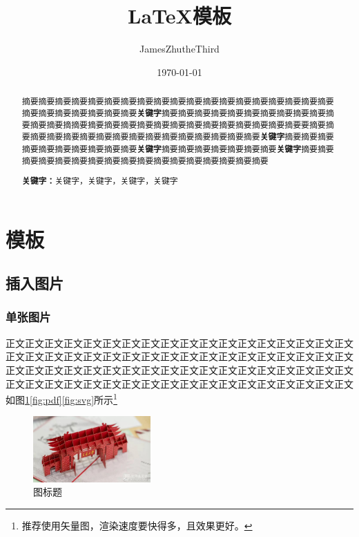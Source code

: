 \documentclass[a4paper]{article}
\title{\LaTeX 模板}
\author{JamesZhutheThird}
\date{\today}
\begin{document}
\maketitle
\pagestyle{fancyStyle}
\thispagestyle{fancyStyleForTitle}

\begin{abstract}
摘要摘要摘要摘要摘要摘要摘要摘要摘要摘要摘要摘要摘要摘要摘要摘要摘要摘要摘要摘要摘要摘要摘要摘要摘要摘要\textbf{关键字}摘要摘要摘要摘要摘要摘要摘要摘要摘要摘要摘要摘要摘要摘摘要摘要摘要摘要摘要摘要摘要摘要摘要摘要摘要摘要摘要摘要要摘要摘要摘要摘要摘要摘要摘要摘要摘要摘要摘要摘要摘要摘要摘要摘要\textbf{关键字}摘要摘要摘要摘要摘要摘要摘要摘要摘要摘要\textbf{关键字}摘要摘要摘要摘要摘要摘要摘要\textbf{关键字}摘要摘要摘要摘要摘要摘要摘要摘要摘要摘要摘要摘要摘要摘要摘要摘要摘要
\par\textbf{关键字：}关键字，关键字，关键字，关键字
\end{abstract}


\section{模板}
\subsection{插入图片}
\subsubsection{单张图片}
正文正文正文正文正文正文正文正文\cite{doi:10.5772/4740}正文正文正文正文正文正文正文正文正文正文正文正文正文正文正文正文正文正文正文正文正文正文正文正文正文正文正文正文正文正文正文正文正文正文正文正文正文正文正文正文正文正文正文正文正文正文正文正文正文正文正文正文正文正文正文正文正文正文正文正文正文正文正文正文如图\ref{fig:single}\ref{fig:pdf}\ref{fig:svg}所示\footnote{推荐使用矢量图，渲染速度要快得多，且效果更好。}

\begin{figure}[!h]
	\centering
	\vspace{0cm}
	\includegraphics[width=0.4\textwidth,trim=50 100 200 75,clip]{figures/fig1.jpg}%
	\vspace{0cm}
	\caption{图标题}
	\label{fig:single}
\end{figure}
\end{document}
